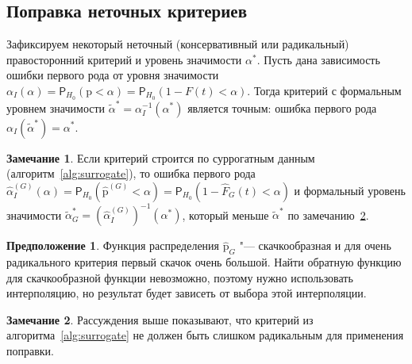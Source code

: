 \documentclass[specialist,
substylefile = spbu_report.rtx,
subf,href,colorlinks=true, 12pt]{disser}
\theoremstyle{definition}
\newtheorem{algorithm}{Алгоритм}
\newtheorem{remark}{Замечание}
\newtheorem{asumption}{Предположение}
\begin{document}
\subsection{Поправка неточных критериев}\label{sect:correction}
Зафиксируем некоторый неточный (консервативный или радикальный) правосторонний критерий и уровень значимости $\alpha^*$. Пусть дана зависимость ошибки первого рода от уровня значимости $\alpha_I(\alpha)=\mathsf P_{H_0}(\mathrm p < \alpha)=\mathsf P_{H_0}(1 - F(t) < \alpha)$. Тогда критерий с формальным уровнем значимости $\widetilde\alpha^*=\alpha_I^{-1}(\alpha^*)$ является точным: ошибка первого рода $\alpha_I(\widetilde\alpha^*)=\alpha^*$.
\begin{remark}
	Если критерий строится по суррогатным данным (алгоритм~\ref{alg:surrogate}), то ошибка первого рода $\hat \alpha_I^{(G)}(\alpha)=\mathsf P_{H_0}(\hat{\mathrm p}^{(G)} < \alpha) = \mathsf P_{H_0}(1 - \hat F_G(t) < \alpha)$ и формальный уровень значимости $\widetilde \alpha_G^* = \left(\hat \alpha_I^{(G)}\right)^{-1}(\alpha^*)$, который меньше $\widetilde\alpha^*$ по замечанию~\ref{remark:liberal}.
\end{remark}
\begin{asumption}
	Функция распределения $\hat{\mathrm p}_G$ "--- скачкообразная и для очень радикального критерия первый скачок очень большой. Найти обратную функцию для скачкообразной функции невозможно, поэтому нужно использовать интерполяцию, но результат будет зависеть от выбора этой интерполяции.
\end{asumption}

\begin{remark}\label{remark:liberal}
	Рассуждения выше показывают, что критерий из алгоритма~\ref{alg:surrogate} не должен быть слишком радикальным для применения поправки.
\end{remark}
\end{document}

